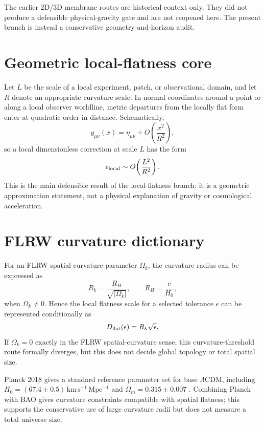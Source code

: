 \documentclass[11pt,a4paper]{article}
\begin{document}
The earlier 2D/3D membrane routes are historical context only. They did not produce a defensible physical-gravity gate and are not reopened here. The present branch is instead a conservative geometry-and-horizon audit.

\section{Geometric local-flatness core}
Let $L$ be the scale of a local experiment, patch, or observational domain, and let $R$ denote an appropriate curvature scale. In normal coordinates around a point or along a local observer worldline, metric departures from the locally flat form enter at quadratic order in distance. Schematically,
\begin{equation}
    g_{\mu\nu}(x)=\eta_{\mu\nu}+O\!\left(\frac{x^2}{R^2}\right),
\end{equation}
so a local dimensionless correction at scale $L$ has the form
\begin{equation}
    \epsilon_{\rm local}\sim O\!\left(\frac{L^2}{R^2}\right).
\end{equation}
This is the main defensible result of the local-flatness branch: it is a geometric approximation statement, not a physical explanation of gravity or cosmological acceleration.

\section{FLRW curvature dictionary}
For an FLRW spatial curvature parameter $\Omega_k$, the curvature radius can be expressed as
\begin{equation}
    R_k = \frac{R_H}{\sqrt{|\Omega_k|}},\qquad R_H=\frac{c}{H_0},
\end{equation}
when $\Omega_k\ne 0$. Hence the local flatness scale for a selected tolerance $\epsilon$ can be represented conditionally as
\begin{equation}
    D_{\rm flat}(\epsilon)=R_k\sqrt{\epsilon}.
\end{equation}
If $\Omega_k=0$ exactly in the FLRW spatial-curvature sense, this curvature-threshold route formally diverges, but this does not decide global topology or total spatial size.

Planck 2018 gives a standard reference parameter set for base $\Lambda$CDM, including $H_0=(67.4\pm0.5)\,\mathrm{km\,s^{-1}\,Mpc^{-1}}$ and $\Omega_m=0.315\pm0.007$ \cite{planck2018}. Combining Planck with BAO gives curvature constraints compatible with spatial flatness; this supports the conservative use of large curvature radii but does not measure a total universe size.
\end{document}
